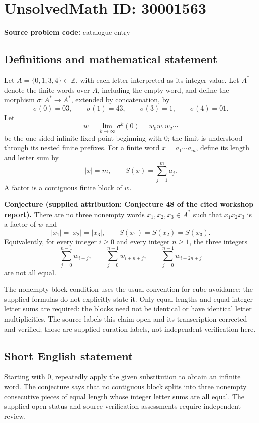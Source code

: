 \documentclass[11pt]{article}
\newcommand{\Z}{\mathbb{Z}}
\begin{document}
\section*{UnsolvedMath ID: 30001563}
\textbf{Source problem code:} catalogue entry
\subsection{Definitions and mathematical statement}
Let \(A=\{0,1,3,4\}\subset\Z\), with each letter interpreted as its integer value. Let \(A^*\) denote the finite words over \(A\), including the empty word, and define the morphism \(\sigma:A^*\to A^*\), extended by concatenation, by
\[
\sigma(0)=03,\qquad \sigma(1)=43,\qquad \sigma(3)=1,\qquad \sigma(4)=01.
\]
Let
\[
w=\lim_{k\to\infty}\sigma^k(0)=w_0w_1w_2\cdots
\]
be the one-sided infinite fixed point beginning with \(0\); the limit is understood through its nested finite prefixes. For a finite word \(x=a_1\cdots a_m\), define its length and letter sum by
\[
|x|=m,\qquad S(x)=\sum_{j=1}^{m}a_j.
\]
A factor is a contiguous finite block of \(w\).

\textbf{Conjecture (supplied attribution: Conjecture 48 of the cited workshop report).} There are no three nonempty words \(x_1,x_2,x_3\in A^*\) such that \(x_1x_2x_3\) is a factor of \(w\) and
\[
|x_1|=|x_2|=|x_3|,\qquad S(x_1)=S(x_2)=S(x_3).
\]
Equivalently, for every integer \(i\geq0\) and every integer \(n\geq1\), the three integers
\[
\sum_{j=0}^{n-1}w_{i+j},\qquad
\sum_{j=0}^{n-1}w_{i+n+j},\qquad
\sum_{j=0}^{n-1}w_{i+2n+j}
\]
are not all equal.

The nonempty-block condition uses the usual convention for cube avoidance; the supplied formulas do not explicitly state it. Only equal lengths and equal integer letter sums are required: the blocks need not be identical or have identical letter multiplicities. The source labels this claim open and its transcription corrected and verified; those are supplied curation labels, not independent verification here.
\subsection{Short English statement}
Starting with \(0\), repeatedly apply the given substitution to obtain an infinite word. The conjecture says that no contiguous block splits into three nonempty consecutive pieces of equal length whose integer letter sums are all equal. The supplied open-status and source-verification assessments require independent review.
\end{document}
